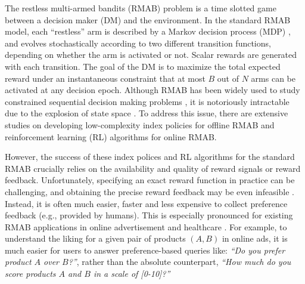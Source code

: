 \documentclass{article} %
\begin{document}
The restless multi-armed bandits (RMAB) problem \citep{whittle1988restless} is a time slotted game between a decision maker (DM) and the environment.  In the standard RMAB model, each ``restless'' arm is described by a Markov decision process (MDP) \citep{puterman1994markov}, and evolves stochastically according to two different transition functions, depending on whether the arm is activated or not. Scalar rewards are generated with each transition. The goal of the DM is to maximize the total expected reward under an instantaneous constraint that at most $B$ out of $N$ arms can be activated at any decision epoch. {Although RMAB has been  widely used to study constrained sequential decision making problems  \citep{meshram2016optimal,bertsimas2000restless,yu2018deadline,borkar2017index,killian2021beyond,mate2021risk,mate2020collapsing,xiong2023reinforcement}, it is notoriously intractable due to the explosion of state space \citep{papadimitriou1994complexity}. To address this issue, there are extensive studies on developing low-complexity index policies \citep{whittle1988restless,larranaga2014index,bagheri2015restless,verloop2016asymptotically, zhang2021restless} for offline RMAB and reinforcement learning (RL) algorithms \citep{tekin2011adaptive,cohen2014restless,fu2019towards,jung2019regret,wang2020restless,nakhleh2021neurwin,xiong2022Nips,avrachenkov2022whittle,xiong2023finite,wang2024online,chen2024gino} for online RMAB. }


However, the success of these index polices and RL algorithms for the standard RMAB crucially relies on the availability and quality of reward signals or reward feedback. Unfortunately, specifying an exact reward function in practice can be challenging, and obtaining the precise reward feedback may be even infeasible \citep{wirth2017survey,casper2023open}.  Instead, it is often much easier, faster and less expensive to collect preference feedback (e.g., provided by humans). This is especially pronounced for existing RMAB applications in online advertisement \citep{meshram2016optimal} and healthcare \citep{killian2021beyond,mate2021risk,mate2020collapsing}. For example, to understand the liking for a given pair of products $(A,B)$ in online ads, it is much easier for users to answer preference-based queries like: \textit{``Do you prefer product $A$ over $B$?''}, rather than the absolute counterpart, \textit{``How much do you score products $A$ and $B$ in a scale of [0-10]?''}
\end{document}

